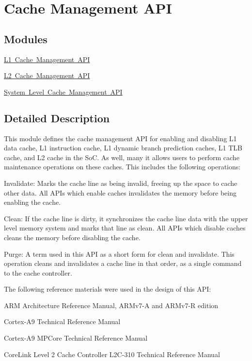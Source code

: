 \hypertarget{group__CACHE__MGR}{}\section{Cache Management A\+PI}
\label{group__CACHE__MGR}
\subsection*{Modules}
\begin{DoxyCompactItemize}
\item 
\mbox{\hyperlink{group__CACHE__L1}{L1 Cache Management A\+PI}}
\item 
\mbox{\hyperlink{group__CACHE__L2}{L2 Cache Management A\+PI}}
\item 
\mbox{\hyperlink{group__CACHE__SYS}{System Level Cache Management A\+PI}}
\end{DoxyCompactItemize}


\subsection{Detailed Description}
This module defines the cache management A\+PI for enabling and disabling L1 data cache, L1 instruction cache, L1 dynamic branch prediction caches, L1 T\+LB cache, and L2 cache in the SoC. As well, many it allows users to perform cache maintenance operations on these caches. This includes the following operations\+:
\begin{DoxyItemize}
\item Invalidate\+: Marks the cache line as being invalid, freeing up the space to cache other data. All A\+P\+Is which enable caches invalidates the memory before being enabling the cache.
\item Clean\+: If the cache line is dirty, it synchronizes the cache line data with the upper level memory system and marks that line as clean. All A\+P\+Is which disable caches cleans the memory before disabling the cache.
\item Purge\+: A term used in this A\+PI as a short form for clean and invalidate. This operation cleans and invalidates a cache line in that order, as a single command to the cache controller.
\end{DoxyItemize}

The following reference materials were used in the design of this A\+PI\+:
\begin{DoxyItemize}
\item A\+RM\textregistered{} Architecture Reference Manual, A\+R\+Mv7-\/A and A\+R\+Mv7-\/R edition
\item Cortex\texttrademark{}-\/A9 Technical Reference Manual
\item Cortex\texttrademark{}-\/A9 M\+P\+Core Technical Reference Manual
\item Core\+Link\texttrademark{} Level 2 Cache Controller L2\+C-\/310 Technical Reference Manual 
\end{DoxyItemize}